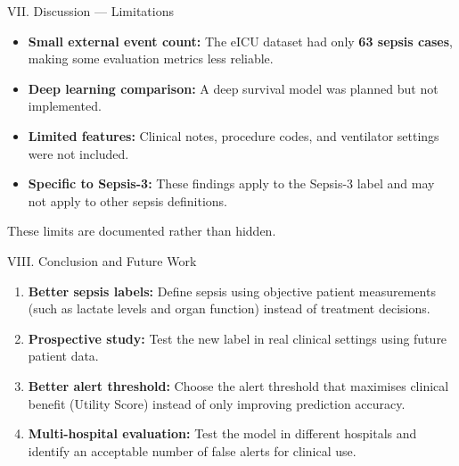 \begin{frame}{VII. Discussion --- Limitations}
\begin{itemize}
  \item \textbf{Small external event count:} The eICU dataset had only
        \textbf{63 sepsis cases}, making some evaluation metrics less
        reliable.
  \item \textbf{Deep learning comparison:} A deep survival model was planned
        but not implemented.
  \item \textbf{Limited features:} Clinical notes, procedure codes, and
        ventilator settings were not included.
  \item \textbf{Specific to Sepsis-3:} These findings apply to the Sepsis-3
        label and may not apply to other sepsis definitions.
\end{itemize}

\vspace{8pt}
\begin{exampleblock}{}
  \centering These limits are documented rather than hidden.
\end{exampleblock}
\end{frame}


\begin{frame}{VIII. Conclusion and Future Work}
\begin{enumerate}
  \item \textbf{Better sepsis labels:} Define sepsis using objective patient
        measurements (such as lactate levels and organ function) instead of
        treatment decisions.
  \item \textbf{Prospective study:} Test the new label in real clinical
        settings using future patient data.
  \item \textbf{Better alert threshold:} Choose the alert threshold that
        maximises clinical benefit (Utility Score) instead of only improving
        prediction accuracy.
  \item \textbf{Multi-hospital evaluation:} Test the model in different
        hospitals and identify an acceptable number of false alerts for
        clinical use.
\end{enumerate}
\end{frame}
